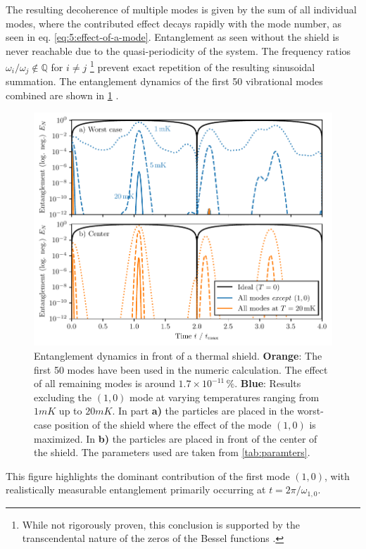 The resulting decoherence of multiple modes is given by the sum of all individual modes, where the contributed effect decays rapidly with the mode number, as seen in eq. \eqref{eq:5:effect-of-a-mode}.
Entanglement as seen without the shield is never reachable due to the quasi-periodicity of the system. The frequency ratios $\omega_i/\omega_j \notin \mathbb{Q}$ for $i\neq j$ \footnote{While not rigorously proven, this conclusion is supported by the transcendental nature of the zeros of the Bessel functions \cite{Lorch_1995}.} prevent exact repetition of the resulting sinusoidal summation.
The entanglement dynamics of the first 50 vibrational modes combined are shown in \cref{fig:5:entanglement-multiple-modes} .
\begin{figure}[!htbp]
  \centering
  \includegraphics[width=\textwidth]{./../figures/vibrations/entanglement-dynamics-all-modes.pdf}
  \caption{Entanglement dynamics in front of a thermal shield. \textbf{Orange}: The first 50 modes have been used in the numeric calculation. The effect of all remaining modes is around $1.7 \times 10^{-11}\,\%$. \textbf{Blue}: Results excluding the $(1,0)$ mode at varying temperatures ranging from $1\si{mK}$ up to $20\si{mK}$. In part \textbf{a)} the particles are placed in the worst-case position of the shield where the effect of the mode $(1,0)$ is maximized. In \textbf{b)} the particles are placed in front of the center of the shield. The parameters used are taken from \cref{tab:paramters}.}
  \label{fig:5:entanglement-multiple-modes}
\end{figure}
This figure highlights the dominant contribution of the first mode $(1,0)$, with realistically measurable entanglement primarily occurring at $t = 2 \pi/\omega_{1,0}$.
